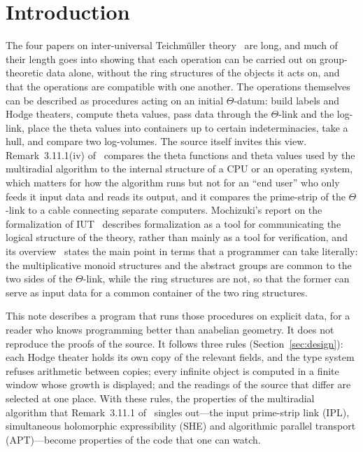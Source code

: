 \documentclass[11pt,a4paper]{article}
\begin{document}
\section{Introduction}\label{sec:intro}

The four papers on inter-universal Teichm\"uller theory~\cite{IUT1,IUT2,IUT3,IUT4} are long, and much of their
length goes into showing that each operation can be carried out on group-theoretic data alone, without the
ring structures of the objects it acts on, and that the operations are compatible with one another. The
operations themselves can be described as procedures acting on an initial $\Theta$-datum: build labels and
Hodge theaters, compute theta values, pass data through the $\Theta$-link and the log-link, place the theta
values into containers up to certain indeterminacies, take a hull, and compare two log-volumes. The source
itself invites this view. Remark~3.11.1(iv) of~\cite{IUT3} compares the theta functions and theta values used
by the multiradial algorithm to the internal structure of a CPU or an operating system, which matters for how the
algorithm runs but not for an ``end user'' who only feeds it input data and reads its output, and it compares
the prime-strip of the $\Theta$-link to a cable connecting separate computers. Mochizuki's report on the
formalization of IUT~\cite[\S1]{Formal} describes formalization as a tool for communicating the logical
structure of the theory, rather than mainly as a tool for verification, and its overview~\cite[\S3]{Formal} states
the main point in terms that a programmer can take literally: the multiplicative monoid structures and the abstract
groups are common to the two sides of the $\Theta$-link, while the ring structures are not, so that the former can
serve as input data for a common container of the two ring structures.

This note describes a program that runs those procedures on explicit data, for a reader who knows programming
better than anabelian geometry. It does not reproduce the proofs of the source. It follows three rules
(Section~\ref{sec:design}): each Hodge theater holds its own copy of the relevant fields, and the type system
refuses arithmetic between copies; every infinite object is computed in a finite window whose growth is
displayed; and the readings of the source that differ are selected at one place. With these rules, the
properties of the multiradial algorithm that Remark~3.11.1 of~\cite{IUT3} singles out---the input prime-strip
link (IPL), simultaneous holomorphic expressibility (SHE) and algorithmic parallel transport (APT)---become
properties of the code that one can watch.
\end{document}
